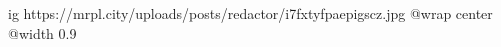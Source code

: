  
 
 
 
 

\ifcmt
  ig https://mrpl.city/uploads/posts/redactor/i7fxtyfpaepigscz.jpg
  @wrap center
  @width 0.9
\fi
